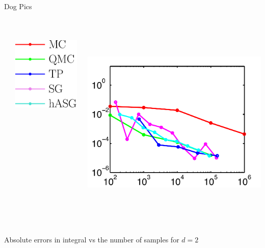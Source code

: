 \documentclass[final]{beamer}
\begin{document}
\begin{frame}{}
{\begin{columns}[t]
\begin{column}{.30\linewidth}
\begin{block}{\centering Dog Pics}
\begin{columns}[T]
\begin{column}{12cm}{}
\end{column}
\begin{column}{4cm}{}
\vspace{2cm}
\centering\includegraphics[height=5cm,width=5cm]{figures/legend}\\
\end{column}
\begin{column}{14cm}{}
\includegraphics[height=10cm, width = 14cm]{figures/maxgaussian2errors}\\
\end{column}
\end{columns}
\vspace{0.5em}
\centering\scriptsize{Absolute errors in integral vs the number of samples for $d=2$}


\end{block}
\end{column}
\end{columns}}
\end{frame}
\end{document}
